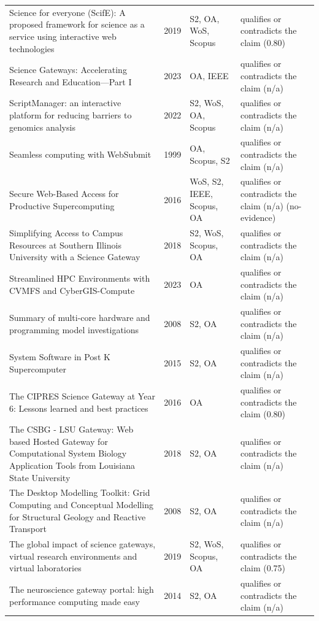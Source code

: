 \begin{longtable}{@{}%
  >{\raggedright\arraybackslash}p{}c%
  >{\raggedright\arraybackslash}p{}%
  >{\raggedright\arraybackslash}p{}@{}}
Science for everyone (ScifE): A proposed framework for science as a service using interactive web technologies & 2019 & S2, OA, WoS, Scopus & qualifies or contradicts the claim (0.80) \\
Science Gateways: Accelerating Research and Education---Part I & 2023 & OA, IEEE & qualifies or contradicts the claim (n/a) \\
ScriptManager: an interactive platform for reducing barriers to genomics analysis & 2022 & S2, WoS, OA, Scopus & qualifies or contradicts the claim (n/a) \\
Seamless computing with WebSubmit & 1999 & OA, Scopus, S2 & qualifies or contradicts the claim (n/a) \\
Secure Web-Based Access for Productive Supercomputing & 2016 & WoS, S2, IEEE, Scopus, OA & qualifies or contradicts the claim (n/a) (no-evidence) \\
Simplifying Access to Campus Resources at Southern Illinois University with a Science Gateway & 2018 & S2, WoS, Scopus, OA & qualifies or contradicts the claim (n/a) \\
Streamlined HPC Environments with CVMFS and CyberGIS-Compute & 2023 & OA & qualifies or contradicts the claim (n/a) \\
Summary of multi-core hardware and programming model investigations & 2008 & S2, OA & qualifies or contradicts the claim (n/a) \\
System Software in Post K Supercomputer & 2015 & S2, OA & qualifies or contradicts the claim (n/a) \\
The CIPRES Science Gateway at Year 6: Lessons learned and best practices & 2016 & OA & qualifies or contradicts the claim (0.80) \\
The CSBG - LSU Gateway: Web based Hosted Gateway for Computational System Biology Application Tools from Louisiana State University & 2018 & S2, OA & qualifies or contradicts the claim (n/a) \\
The Desktop Modelling Toolkit: Grid Computing and Conceptual Modelling for Structural Geology and Reactive Transport & 2008 & S2, OA & qualifies or contradicts the claim (n/a) \\
The global impact of science gateways, virtual research environments and virtual laboratories & 2019 & S2, WoS, Scopus, OA & qualifies or contradicts the claim (0.75) \\
The neuroscience gateway portal: high performance computing made easy & 2014 & S2, OA & qualifies or contradicts the claim (n/a) \\

\end{longtable}
